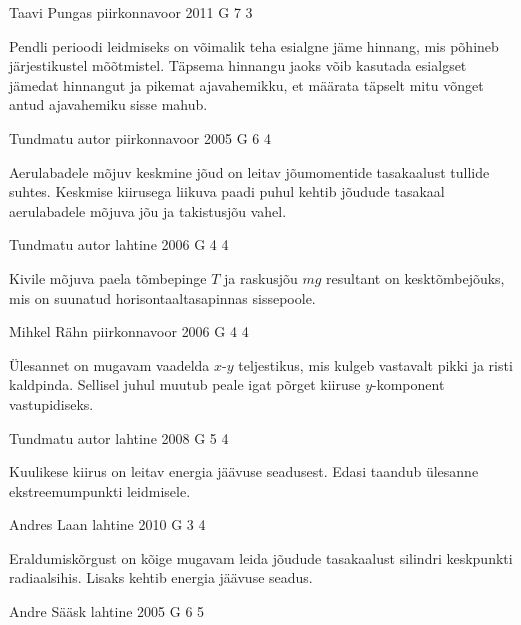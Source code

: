\documentclass[11pt]{article}
\begin{document}
{%
{Taavi Pungas} %
{piirkonnavoor} %
{2011} %
{G 7} %
{3} %
{

\ifHint
Pendli perioodi leidmiseks on võimalik teha esialgne jäme hinnang, mis põhineb järjestikustel mõõtmistel. Täpsema hinnangu jaoks võib kasutada esialgset jämedat hinnangut ja pikemat ajavahemikku, et määrata täpselt mitu võnget antud ajavahemiku sisse mahub.
\fi
}

{Tundmatu autor} %
{piirkonnavoor} %
{2005} %
{G 6} %
{4} %
{

\ifHint
Aerulabadele mõjuv keskmine jõud on leitav jõumomentide tasakaalust tullide suhtes. Keskmise kiirusega liikuva paadi puhul kehtib jõudude tasakaal aerulabadele mõjuva jõu ja takistusjõu vahel.
\fi
}

{Tundmatu autor} %
{lahtine} %
{2006} %
{G 4} %
{4} %
{

\ifHint
Kivile mõjuva paela tõmbepinge $T$ ja raskusjõu $mg$ resultant on kesktõmbejõuks, mis on suunatud horisontaaltasapinnas sissepoole.
\fi
}

{Mihkel Rähn} %
{piirkonnavoor} %
{2006} %
{G 4} %
{4} %
{

\ifHint
Ülesannet on mugavam vaadelda $x$-$y$ teljestikus, mis kulgeb vastavalt pikki ja risti kaldpinda. Sellisel juhul muutub peale igat põrget kiiruse $y$-komponent vastupidiseks.
\fi
}

{Tundmatu autor} %
{lahtine} %
{2008} %
{G 5} %
{4} %
{

\ifHint
Kuulikese kiirus on leitav energia jäävuse seadusest. Edasi taandub ülesanne ekstreemumpunkti leidmisele.
\fi
}

{Andres Laan} %
{lahtine} %
{2010} %
{G 3} %
{4} %
{

\ifHint
Eraldumiskõrgust on kõige mugavam leida jõudude tasakaalust silindri keskpunkti radiaalsihis. Lisaks kehtib energia jäävuse seadus.
\fi
}

{Andre Sääsk} %
{lahtine} %
{2005} %
{G 6} %
{5} %
{

}}
\end{document}
